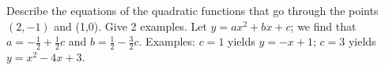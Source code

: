 {Describe the equations of the quadratic functions that go through the points $(2,-1)$ and (1,0). Give 2 examples.}
{Let $y = ax^2+bx+c$; we find that $a = -\frac12+\frac12 c$ and $b = \frac12-\frac32c$. Examples: $c=1$ yields $y = -x+1$; $c=3$ yields $y=x^2-4x+3$.
}